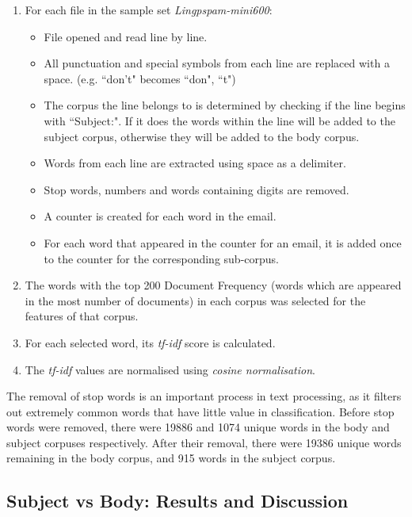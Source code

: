 \documentclass[10pt, a4paper]{article}
\begin{document}
\begin{enumerate}
\item For each file in the sample set \emph{Lingpspam-mini600}:
	\begin{itemize}
	\item File opened and read line by line.
	\item All punctuation and special symbols from each line are replaced with a space. (e.g. ``don't" becomes ``don", ``t")
	\item The corpus the line belongs to is determined by checking if the line begins with ``Subject:". If it does the words within the line will be added to the subject corpus, otherwise they will be added to the body corpus.
	\item Words from each line are extracted using space as a delimiter.
	\item Stop words, numbers and words containing digits are removed.
	\item A counter is created for each word in the email.
	\item For each word that appeared in the counter for an email, it is added once to the counter for the corresponding sub-corpus.
	\end{itemize}
\item The words with the top 200 Document Frequency (words which are appeared in the most number of documents) in each corpus was selected for the features of that corpus.
\item For each selected word, its \emph{tf-idf} score is calculated.
\item The \emph{tf-idf} values are normalised using \emph{cosine normalisation}.
\end{enumerate}

The removal of stop words is an important process in text processing, as it filters out extremely common words that have little value in classification. Before stop words were removed, there were 19886 and 1074 unique words in the body and subject corpuses respectively. After their removal, there were 19386 unique words remaining in the body corpus, and 915 words in the subject corpus.




\subsection*{Subject vs Body: Results and Discussion}
\end{document}
